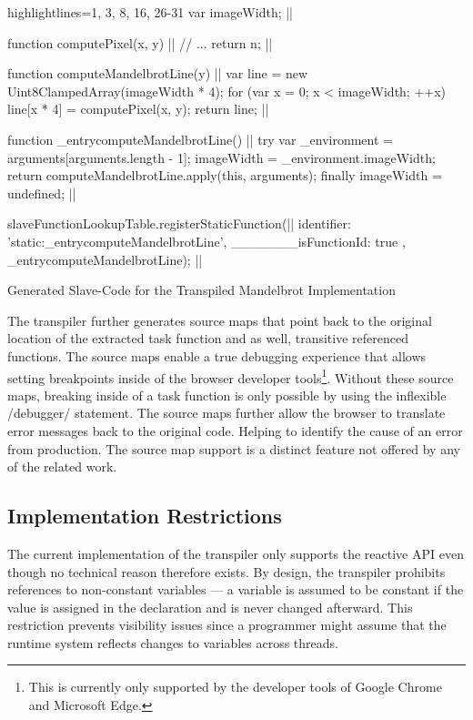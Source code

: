 \begin{listing}
\begin{javascriptcode*}{highlightlines={1, 3, 8, 16, 26-31}}
var imageWidth; |$\label{code:slave-image-width}$|

function computePixel(x, y) { |$\label{code:slave-compute-pixel-start}$|
	// ...
	return n;
}|$\label{code:slave-compute-pixel-end}$|

function computeMandelbrotLine(y) { |$\label{code:slave-task function-start}$|
	var line = new Uint8ClampedArray(imageWidth * 4);
	for (var x = 0; x < imageWidth; ++x) {
		line[x * 4] = computePixel(x, y);
	}
	return line;
}|$\label{code:slave-task function-end}$|
 
function _entrycomputeMandelbrotLine() { |$\label{code:slave-entry-function-start}$|
	try {
		var _environment = arguments[arguments.length - 1];
		imageWidth = _environment.imageWidth;
		return computeMandelbrotLine.apply(this, arguments);
	} finally {
		imageWidth = undefined;
	}
} |$\label{code:slave-entry-function-end}$|

slaveFunctionLookupTable.registerStaticFunction({|$\label{code:slave-register-function-start}$|
		identifier: 'static:_entrycomputeMandelbrotLine',
		_______isFunctionId: true
	}, _entrycomputeMandelbrotLine); |$\label{code:slave-register-function-end}$|
\end{javascriptcode*}
\caption{Generated Slave-Code for the Transpiled Mandelbrot Implementation}
\label{fig:transpiled-mandelbrot-slave}
\end{listing}

The transpiler further generates source maps that point back to the original location of the extracted task function and as well, transitive referenced functions. The source maps enable a true debugging experience that allows setting breakpoints inside of the browser developer tools\footnote{This is currently only supported by the developer tools of Google Chrome and Microsoft Edge.}. Without these source maps, breaking inside of a task function is only possible by using the inflexible \javascriptinline/debugger/ statement. The source maps further allow the browser to translate error messages back to the original code. Helping to identify the cause of an error from production. The source map support is a distinct feature not offered by any of the related work.

\subsection{Implementation Restrictions}
The current implementation of the transpiler only supports the reactive API even though no technical reason therefore exists.  By design, the transpiler prohibits references to non-constant variables --- a variable is assumed to be constant if the value is assigned in the declaration and is never changed afterward. This restriction prevents visibility issues since a programmer might assume that the runtime system reflects changes to variables across threads. 

